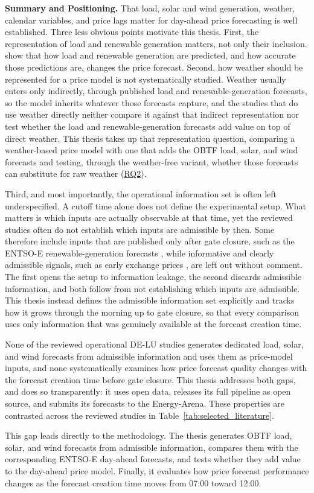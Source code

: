 \noindent\textbf{Summary and Positioning.}
That load, solar and wind generation, weather, calendar variables, and
price lags matter for day-ahead price forecasting is well established. Three less
obvious points motivate this thesis. First, the representation of load and
renewable generation matters, not only their inclusion. \textcite{maciejowska2021enhancing}
show that how load and renewable generation are predicted, and how accurate those
predictions are, changes the price forecast. Second, how weather should be represented for a price model is not
systematically studied. Weather usually enters only indirectly, through
published load and renewable-generation forecasts, so the model inherits
whatever those forecasts capture, and the studies that do use weather directly
neither compare it against that indirect representation nor test whether the
load and renewable-generation forecasts add value on top of direct weather. This thesis
takes up that representation question, comparing a weather-based price model
with one that adds the OBTF load, solar, and wind forecasts and testing, through the
weather-free variant, whether those forecasts can substitute for raw weather
(\hyperlink{rq:price_impact_generated_forecasts}{RQ2}).

Third, and most importantly, the operational information set is often left
underspecified. A cutoff time alone does not define the experimental setup. What
matters is which inputs are actually observable at that time, yet the reviewed
studies often do not establish which inputs are admissible by then. Some
therefore include inputs that are published only after
gate closure, such as the \mbox{ENTSO-E} renewable-generation forecasts
\cite{trebbien2023probabilistic,marcjasz2023distributional,hilger2024multivariate},
while informative and clearly admissible signals, such as early exchange prices
\cite{ziel2015exaa}, are left out without comment. The first opens the setup to information leakage,
the second discards admissible information, and both follow from not
establishing which inputs are admissible. This
thesis instead defines the admissible information set explicitly and tracks how
it grows through the morning up to gate closure, so that every comparison uses
only information that was genuinely available at the forecast creation time.

None of the reviewed operational \mbox{DE-LU} studies generates dedicated load,
solar, and wind forecasts from admissible information and uses them as
price-model inputs, and none systematically examines how price forecast quality
changes with the forecast creation time before gate closure. This thesis
addresses both gaps, and does so transparently: it uses open data,
releases its full pipeline as open source, and submits its forecasts to the
Energy-Arena. These properties are contrasted across
the reviewed studies in Table~\ref{tab:selected_literature}.

This gap leads directly to the methodology. The thesis generates OBTF load, solar, and wind forecasts from
admissible information, compares them with the corresponding \mbox{ENTSO-E}
day-ahead forecasts, and tests whether they add value to the day-ahead price
model. Finally, it evaluates how price forecast performance
changes as the forecast creation time moves from 07:00 toward 12:00.
